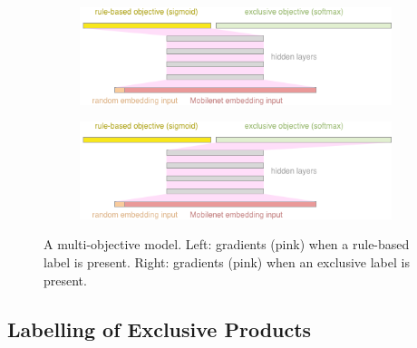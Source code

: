 \begin{figure}
  \hspace{-20pt}
\begin{subfigure}{.5\textwidth}
  \centering
  \includegraphics[width=\linewidth]{figures/slides/multi_objective_model_RB}
\end{subfigure}%
\hspace{20pt}
\begin{subfigure}{.5\textwidth}
  \centering
  \includegraphics[width=\linewidth]{figures/slides/multi_objective_model_ex}
\end{subfigure}
\caption{A multi-objective model. Left: gradients (pink) when a rule-based label is present. Right: gradients (pink) when an exclusive label is present.}
\label{multiobj_model}
\end{figure}



\subsection{Labelling of Exclusive Products}
\label{labex}

